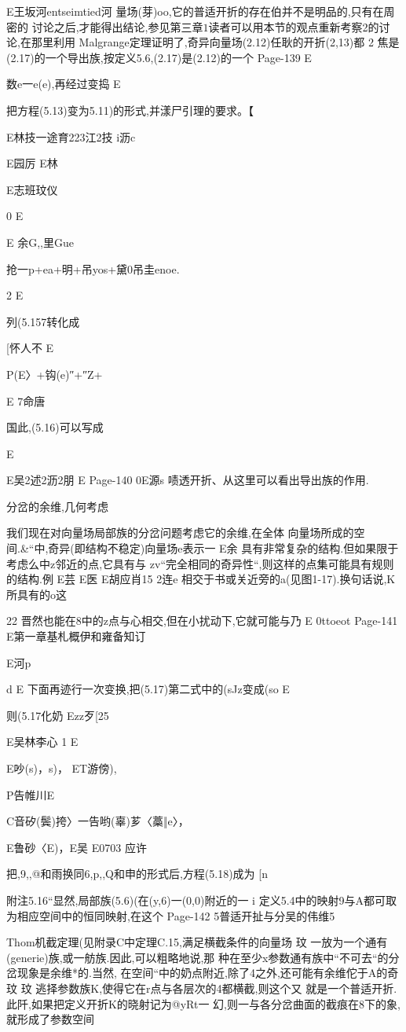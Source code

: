 {{{{{{{E王坂河entseimtied河
量场(芽)oo,它的普适开折的存在伯并不是明品的,只有在周密的
讨论之后,才能得出结论,参见第三章$1

读者可以用本节的观点重新考察$2的讨论,在那里利用
Malgrange定理证明了,奇异向量场(2.12)任耿的开折(2,13)都
2
焦是(2.17)的一个导出族,按定义5.6,(2.17)是(2.12)的一个
Page-139
E

数e一e(e),再经过变捣
E

把方程(5.13)变为5.11)的形式,并漾尸引理的要求。【

E林技一途育223江2技
i沥c

E园厉
E林

E志班玟仪

0
E

E
余G,,里Gue
{抢一p+ea+明+吊yos+黛0吊圭enoe.

2
E

列(5.157转化成

[怀人不
E{P(E〉+钩(e)″+″Z+

E
7命唐

国此,(5.16)可以写成

E

E吴2述2沥2朋
E
Page-140
0E源s
啧透开折、从这里可以看出导出族的作用.

分岔的余维,几何考虑

我们现在对向量场局部族的分岔问题考虑它的余维,在全体
向量场所成的空间.&“中,奇异(即结构不稳定)向量场e表示一
E余
具有非常复杂的结构.但如果限于考虑么中z邻近的点,它具有与
zv“完全相同的奇异性“,则这样的点集可能具有规则的结构.例
E芸
E医
E胡应肖15
2连e
相交于书或关近旁的a(见图1-17).换句话说,K所具有的o这

22
晋然也能在8中的z点与心相交,但在小扰动下,它就可能与乃
E
0ttoeot
Page-141
E第一章基札概伊和雍备知订

E河p

d
E
下面再迹行一次变换,把(5.17)第二式中的(sJz变成(so
E

则(5.17化奶
Ezz歹[25

E吴林李心
1
E

E吵(s)，s)，
ET游傍),

P告帷川E

C音矽(鬓)挎〉一告哟(辜)芗〈藁‖e〉，

E鲁砂〈E)，E吴
E0703
应许

把,9,,@和雨换同6,p,,Q和申的形式后,方程(5.18)成为
[n

附注5.16“显然,局部族(5.6)(在(y,6)一(0,0)附近的一
i
定义5.4中的映射9与A都可取为相应空间中的恒同映射,在这个
Page-142
5普适开扯与分吴的伟维5

Thom机截定理(见附录C中定理C.15,满足横截条件的向量场
玟
一放为一个通有(generie)族,或一舫族.因此,可以粗略地说,那
种在至少x参数通有族中“不可去“的分岔现象是余维*的.当然,
在空间“中的奶点附近,除了4之外,还可能有余维佗于A的奇
玟
玟
逃择参数族K,使得它在r点与各层次的4都横截,则这个又
就是一个普适开折.此阡,如果把定义开折K的晓射记为@yRt一
幻,则一与各分岔曲面的截痕在8下的象,就形成了参数空间

}}}}}}}}}
